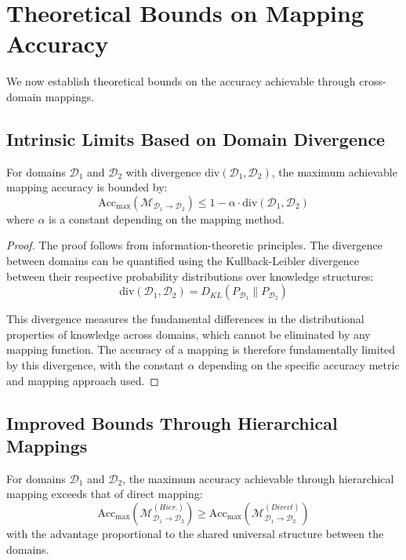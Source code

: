 \section{Theoretical Bounds on Mapping Accuracy}

We now establish theoretical bounds on the accuracy achievable through cross-domain mappings.

\subsection{Intrinsic Limits Based on Domain Divergence}

\begin{theorem}
For domains $\mathcal{D}_1$ and $\mathcal{D}_2$ with divergence $\text{div}(\mathcal{D}_1, \mathcal{D}_2)$, the maximum achievable mapping accuracy is bounded by:
\begin{equation}
\text{Acc}_{\max}(\mathcal{M}_{\mathcal{D}_1 \rightarrow \mathcal{D}_2}) \leq 1 - \alpha \cdot \text{div}(\mathcal{D}_1, \mathcal{D}_2)
\end{equation}
where $\alpha$ is a constant depending on the mapping method.
\end{theorem}

\begin{proof}
The proof follows from information-theoretic principles. The divergence between domains can be quantified using the Kullback-Leibler divergence between their respective probability distributions over knowledge structures:
\begin{equation}
\text{div}(\mathcal{D}_1, \mathcal{D}_2) = D_{KL}(P_{\mathcal{D}_1} \| P_{\mathcal{D}_2})
\end{equation}

This divergence measures the fundamental differences in the distributional properties of knowledge across domains, which cannot be eliminated by any mapping function. The accuracy of a mapping is therefore fundamentally limited by this divergence, with the constant $\alpha$ depending on the specific accuracy metric and mapping approach used.
\end{proof}

\subsection{Improved Bounds Through Hierarchical Mappings}

\begin{theorem}
For domains $\mathcal{D}_1$ and $\mathcal{D}_2$, the maximum accuracy achievable through hierarchical mapping exceeds that of direct mapping:
\begin{equation}
\text{Acc}_{\max}(\mathcal{M}^{(Hier.)}_{\mathcal{D}_1 \rightarrow \mathcal{D}_2}) \geq \text{Acc}_{\max}(\mathcal{M}^{(Direct)}_{\mathcal{D}_1 \rightarrow \mathcal{D}_2})
\end{equation}
with the advantage proportional to the shared universal structure between the domains.
\end{theorem}

